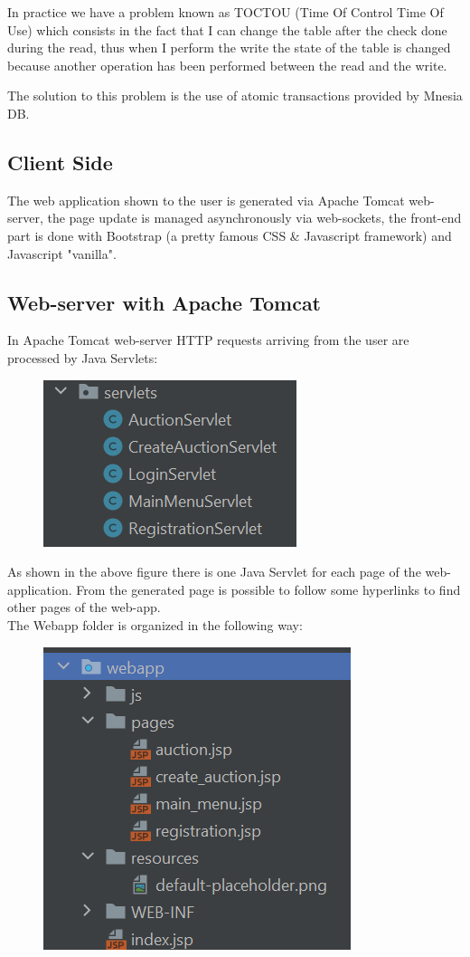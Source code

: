 \noindent In practice we have a problem known as TOCTOU (Time Of Control Time Of Use) which consists in the fact that I can change the table after the check done during the read, thus when I perform the write the state of the table is changed because another operation has been performed between the read and the write.

\noindent The solution to this problem is the use of atomic transactions provided by Mnesia DB.

\subsection{Client Side}
The web application shown to the user is generated via Apache Tomcat web-server, the page update is managed asynchronously via web-sockets, the front-end part is done with Bootstrap (a pretty famous CSS \& Javascript framework) and Javascript "vanilla". 

\subsection{Web-server with Apache Tomcat}
In Apache Tomcat web-server HTTP requests arriving from the user are processed by Java Servlets:\\

 \begin{figure}[H]
 	\centering
 	\includegraphics[width=0.4\linewidth]{img/servlets}
 	\caption{}
 	\label{fig:servlets}
 \end{figure}
 

As shown in the above figure there is one Java Servlet for each page of the web-application. From the generated page is possible to follow some hyperlinks to find other pages of the web-app.\\
The Webapp folder is organized in the following way:
\begin{figure}[H]
	\centering
	\includegraphics[width=0.4\linewidth]{img/webapp}
	\caption{}
	\label{fig:webapp}
\end{figure}

